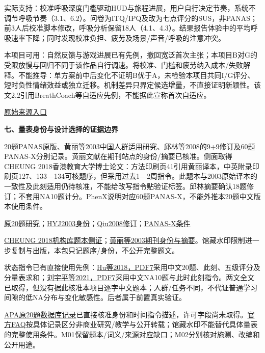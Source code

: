 \documentclass[11pt,a4paper]{article}
\newcommand{\reviewsection}[1]{\par\Needspace{9\baselineskip}\vspace{10pt}\begin{center}{\titlelatin\titlecjk\bfseries\fontsize{14}{20}\selectfont #1}\end{center}}
\begin{document}
实际支持：校准呼吸深度门槛驱动HUD与旅程进展，用户自行决定节奏，系统不调节呼吸节奏（3.1、6.2）。问卷为ITQ/IPQ及改为七点评分的SUS，非PANAS；前3人后校准脚本修改，呼吸分析保留18人（4.1、4.3）。结果报告体验中的平均呼吸速率下降；同时发现校准负担、疲劳及场景/声音/呼吸的注意冲突。

本项目可用：自然反馈与游戏进展已有先例，撤回宽泛首次主张；本项目B对G的受限放慢与回归不同于该作品自行调速。将校准、门槛和疲劳纳入成本/失败解释。不能推导：单方案前中后变化不证明B优于A，未检验本项目共同I/G评分、短时负性情绪效益或独立迁移。机制差异只界定候选增量，不直接证明新颖性。该文2.2引用BreathCoach等自适应先例，不能据此宣称首次自适应。

\href{https://doi.org/10.1145/3613904.3641986}{原始来源入口}

\newpage\reviewsection{七、量表身份与设计选择的证据边界}
20题PANAS原版、黄丽等2003中国人群适用研究、邱林等2008的9+9修订及60题PANAS-\allowbreak{}X分别记录。黄丽文献在期刊站点的身份/摘要已核准。侧面取得CHEUNG 2018香港教育大学博士论文：方法印刷页41引用黄丽译本，中英附录印刷页127、133—134可核题序，但采用过去1—2周指令。此题本与2003原始译本的一致性及此刻适用仍待核准，不能给改写指令贴验证标签。邱林摘要确认18题修订；不套用NA10题计分。PhenX说明对应60题PANAS-\allowbreak{}X，不能外推本20题中文版本使用条件。

\href{https://doi.org/10.1037/0022-3514.54.6.1063}{原20题研究}；\href{https://doi.org/10.3321/j.issn:1000-6729.2003.01.018}{HYJ2003身份}；\href{https://cnki.istiz.org.cn/kcms/detail/detail.aspx?dbcode=CJFQ&dbname=CJFD2008&filename=YXNX200803009}{Qiu2008修订}；\href{https://www.phenxtoolkit.org/protocols/view/180501}{PANAS-X条件}

\href{https://www.lib.eduhk.hk/pure-data/pub/202201871.pdf}{CHEUNG 2018机构库题本侧证}；\href{https://zxws.cbpt.cnki.net/portal/journal/portal/client/paper/a793f765d726bf9a5f28aed99964ee07}{黄丽等2003期刊身份与摘要}。馆藏水印限制进一步复制与出版，本包只记题序/身份，不公开完整题文。

状态指令已有直接使用先例：\href{https://doi.org/10.1111/aphw.12133}{Hu等2018，PDF7}采用中文20题、此刻、五级评分及分量表求和；\href{https://doi.org/10.3724/SP.J.1041.2021.00244}{刘宇平等2021，PDF7}采用中文NA10题与此时此刻指令。两文全文已取得，但没有据此核准本项目逐字中文题本；人群/任务不同，不代证普通学习间隙的低NA分布与变化敏感性。后者属于前置真实验证。

\href{https://doi.org/10.1037/t03592-000}{APA原20题数据库记录}已直接核准身份和时间指令描述，许可字段尚未取得。\href{https://www.apa.org/pubs/databases/psyctests/faq}{官方FAQ}按具体记录区分非商业研究/教学与公开转载；馆藏水印不能替代具体量表的完整使用条件。M01保留题本/词义/来源对应缺口；M02分别核对施测、改编和公开用途。
\end{document}
